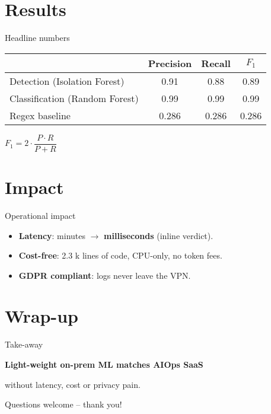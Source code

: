 \documentclass[15pt,aspectratio=169]{beamer}
\newcommand{\IForest}{Isolation Forest\xspace}
\newcommand{\RForest}{Random Forest\xspace}
\newcommand{\LOC}{lines of code\xspace}
\begin{document}
\section{Results}

\begin{frame}{Headline numbers}
\centering
\begin{tabular}{lccc}
  \toprule
   & Precision & Recall & $F_{1}$ \\
  \midrule
  Detection (\IForest)        & 0.91 & 0.88 & 0.89 \\
  Classification (\RForest)   & 0.99 & 0.99 & 0.99 \\
  \addlinespace
  Regex baseline              & 0.286 & 0.286 & 0.286 \\
  \bottomrule
\end{tabular}

\vspace{.8em}
\small
$F_{1} = 2 \cdot \dfrac{P \cdot R}{P + R}$
\end{frame}

\section{Impact}

\begin{frame}{Operational impact}
\begin{itemize}[<+->]
  \item \textbf{Latency}: minutes $\rightarrow$ \textbf{milliseconds} (inline verdict).
  \item \textbf{Cost-free}: 2.3 k \LOC{}, CPU-only, no token fees.
  \item \textbf{GDPR compliant}: logs never leave the VPN.
\end{itemize}
\end{frame}

\section{Wrap-up}

\begin{frame}{Take-away}
\vspace{2em}
\centering
{\Large
  \textbf{Light-weight on-prem ML matches AIOps SaaS}\par
  \vspace{.4em}
  without latency, cost or privacy pain.
}

\vspace{2.2em}
\small
Questions welcome -- thank you!
\end{frame}
\end{document}
